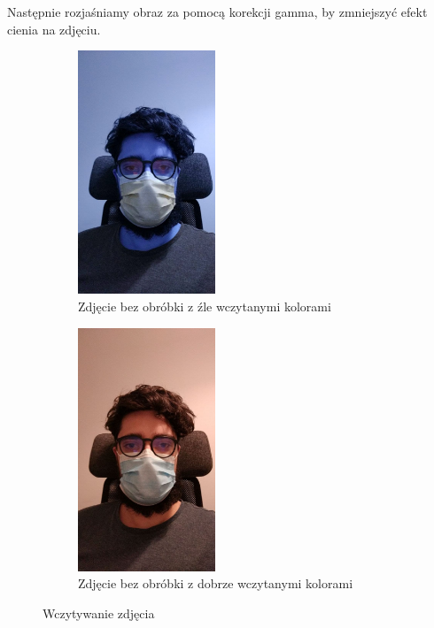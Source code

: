 \documentclass[12pt]{article}
\begin{document}
		Następnie rozjaśniamy obraz za pomocą korekcji gamma, by zmniejszyć efekt cienia na zdjęciu.
		\begin{figure}
			\centering
			\begin{subfigure}[b]{0.49\textwidth}
				\centering
				\includegraphics[width=0.45\textwidth]{rgb_to_bgr.jpeg}
				\caption{Zdjęcie bez obróbki z źle wczytanymi kolorami}
				\label{fig:bgr}
			\end{subfigure}
			\hfil
			\begin{subfigure}[b]{0.49\textwidth}
				\centering
				\includegraphics[width=0.45\textwidth]{nieprzerobione.jpeg}
				\caption{Zdjęcie bez obróbki z dobrze wczytanymi kolorami}
				\label{fig:nieprzerobione}
			\end{subfigure}
			\caption{Wczytywanie zdjęcia}
		\end{figure}
\end{document}
